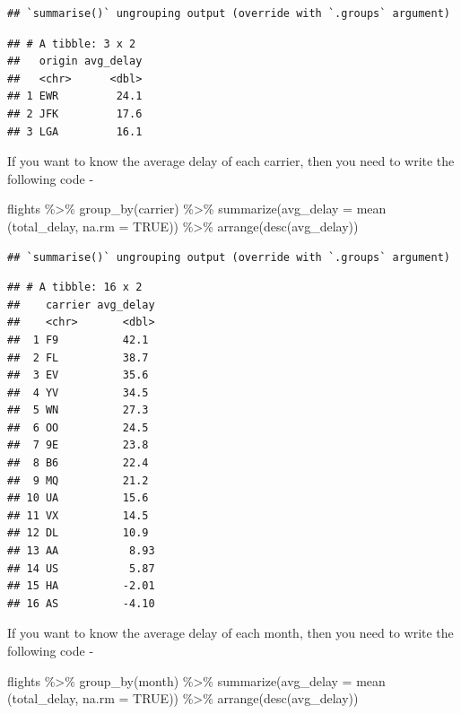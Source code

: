 \documentclass[
]{book}
\newenvironment{Shaded}{\begin{snugshade}}{\end{snugshade}}
\newcommand{\AttributeTok}[1]{\textcolor[rgb]{0.77,0.63,0.00}{#1}}
\newcommand{\ConstantTok}[1]{\textcolor[rgb]{0.00,0.00,0.00}{#1}}
\newcommand{\FunctionTok}[1]{\textcolor[rgb]{0.00,0.00,0.00}{#1}}
\newcommand{\NormalTok}[1]{#1}
\newcommand{\SpecialCharTok}[1]{\textcolor[rgb]{0.00,0.00,0.00}{#1}}
\begin{document}
\begin{verbatim}
## `summarise()` ungrouping output (override with `.groups` argument)
\end{verbatim}

\begin{verbatim}
## # A tibble: 3 x 2
##   origin avg_delay
##   <chr>      <dbl>
## 1 EWR         24.1
## 2 JFK         17.6
## 3 LGA         16.1
\end{verbatim}

If you want to know the average delay of each carrier, then you need to write the following code -

\begin{Shaded}
\begin{Highlighting}[]
\NormalTok{flights }\SpecialCharTok{\%\textgreater{}\%} 
  \FunctionTok{group\_by}\NormalTok{(carrier) }\SpecialCharTok{\%\textgreater{}\%} 
  \FunctionTok{summarize}\NormalTok{(}\AttributeTok{avg\_delay =} \FunctionTok{mean}\NormalTok{ (total\_delay, }\AttributeTok{na.rm =} \ConstantTok{TRUE}\NormalTok{)) }\SpecialCharTok{\%\textgreater{}\%} 
  \FunctionTok{arrange}\NormalTok{(}\FunctionTok{desc}\NormalTok{(avg\_delay))}
\end{Highlighting}
\end{Shaded}

\begin{verbatim}
## `summarise()` ungrouping output (override with `.groups` argument)
\end{verbatim}

\begin{verbatim}
## # A tibble: 16 x 2
##    carrier avg_delay
##    <chr>       <dbl>
##  1 F9          42.1 
##  2 FL          38.7 
##  3 EV          35.6 
##  4 YV          34.5 
##  5 WN          27.3 
##  6 OO          24.5 
##  7 9E          23.8 
##  8 B6          22.4 
##  9 MQ          21.2 
## 10 UA          15.6 
## 11 VX          14.5 
## 12 DL          10.9 
## 13 AA           8.93
## 14 US           5.87
## 15 HA          -2.01
## 16 AS          -4.10
\end{verbatim}

If you want to know the average delay of each month, then you need to write the following code -

\begin{Shaded}
\begin{Highlighting}[]
\NormalTok{flights }\SpecialCharTok{\%\textgreater{}\%} 
  \FunctionTok{group\_by}\NormalTok{(month) }\SpecialCharTok{\%\textgreater{}\%} 
  \FunctionTok{summarize}\NormalTok{(}\AttributeTok{avg\_delay =} \FunctionTok{mean}\NormalTok{ (total\_delay, }\AttributeTok{na.rm =} \ConstantTok{TRUE}\NormalTok{)) }\SpecialCharTok{\%\textgreater{}\%} 
  \FunctionTok{arrange}\NormalTok{(}\FunctionTok{desc}\NormalTok{(avg\_delay))}
\end{Highlighting}
\end{Shaded}
\end{document}
